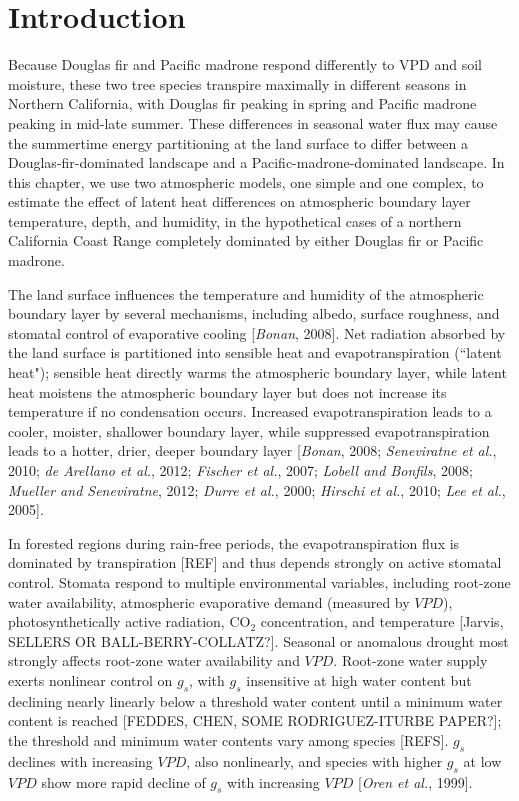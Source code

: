 \linespread{1.6}\selectfont

\section{Introduction}

Because Douglas fir and Pacific madrone respond differently to VPD and soil moisture, these two tree species transpire maximally in different seasons in Northern California, with Douglas fir peaking in spring and Pacific madrone peaking in mid-late summer.  These differences in seasonal water flux may cause the summertime energy partitioning at the land surface to differ between a Douglas-fir-dominated landscape and a Pacific-madrone-dominated landscape.  In this chapter, we use two atmospheric models, one simple and one complex, to estimate the effect of latent heat differences on atmospheric boundary layer temperature, depth, and humidity, in the hypothetical cases of a northern California Coast Range completely dominated by either Douglas fir or Pacific madrone.

The land surface influences the temperature and humidity of the atmospheric boundary layer by several mechanisms, including albedo, surface roughness, and stomatal control of evaporative cooling [\textit{Bonan}, 2008].  Net radiation absorbed by the land surface is partitioned into sensible heat and evapotranspiration (``latent heat"); sensible heat directly warms the atmospheric boundary layer, while latent heat moistens the atmospheric boundary layer but does not increase its temperature if no condensation occurs.  Increased evapotranspiration leads to a cooler, moister, shallower boundary layer, while suppressed evapotranspiration leads to a hotter, drier, deeper boundary layer [\textit{Bonan}, 2008; \textit{Seneviratne et al.}, 2010; \textit{de Arellano et al.}, 2012; \textit{Fischer et al.}, 2007; \textit{Lobell and Bonfils}, 2008; \textit{Mueller and Seneviratne}, 2012; \textit{Durre et al.}, 2000; \textit{Hirschi et al.}, 2010; \textit{Lee et al.}, 2005].  

In forested regions during rain-free periods, the evapotranspiration flux is dominated by transpiration [REF] and thus depends strongly on active stomatal control.  Stomata respond to multiple environmental variables, including root-zone water availability, atmospheric evaporative demand (measured by $VPD$), photosynthetically active radiation, CO$_2$ concentration, and temperature [Jarvis, SELLERS OR BALL-BERRY-COLLATZ?].  Seasonal or anomalous drought most strongly affects root-zone water availability and $VPD$.  Root-zone water supply exerts nonlinear control on $g_s$, with $g_s$ insensitive at high water content but declining nearly linearly below a threshold water content until a minimum water content is reached [FEDDES, CHEN, SOME RODRIGUEZ-ITURBE PAPER?]; the threshold and minimum water contents vary among species [REFS].  $g_s$ declines with increasing $VPD$, also nonlinearly, and species with higher $g_s$ at low $VPD$ show more rapid decline of $g_s$ with increasing $VPD$ [\textit{Oren et al.}, 1999].

